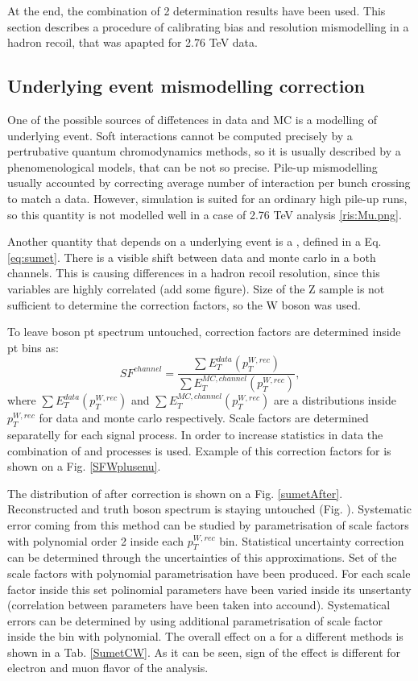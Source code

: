 At the end, the combination of 2 determination results have been used. This section describes a procedure of calibrating bias and resolution mismodelling in a hadron recoil, that was apapted for 2.76 TeV data. 

\subsection{Underlying event mismodelling correction}
One of the possible sources of diffetences in data and MC is a modelling of underlying event. Soft interactions cannot be computed precisely by a pertrubative quantum chromodynamics methods, so it is usually described by a phenomenological models, that can be not so precise.  
Pile-up mismodelling usually accounted by correcting average number of interaction per bunch crossing to match a data. However, \atlas simulation is suited for an ordinary high pile-up runs, so this quantity is not modelled well in a case of 2.76 TeV analysis \ref{ris:Mu.png}. 

Another quantity that depends on a underlying event is a \sumet, defined in a Eq. \ref{eq:sumet}.   There is a visible shift between data and monte carlo in a both channels. This is causing differences in a hadron recoil resolution, since this variables are highly correlated (add some figure).  Size of the Z sample is not sufficient to determine the correction factors, so the W boson was used. 

To leave boson pt spectrum untouched, correction factors are determined inside pt bins as:
\begin{equation}
SF^{channel}=\frac{\sum E_T^{data} (p_T^{W, rec})}{\sum E_T^{MC, channel} (p_T^{W, rec})},
\end{equation}
where $\sum E_T^{data} (p_T^{W, rec})$ and $\sum E_T^{MC, channel} (p_T^{W, rec})$  are a \sumet distributions inside $p_T^{W, rec}$ for data and monte carlo respectively. Scale factors are determined separatelly for each signal process.  In order to increase statistics in data the combination of \wenu and \wmunu processes is used. Example of this correction factors for \wplusenu is shown on a Fig. \ref{SFWplusenu}. 

The distribution of \sumet after correction is shown on a Fig. \ref{sumetAfter}. Reconstructed and truth boson spectrum is staying untouched (Fig. ).  Systematic error coming from this method can be studied by parametrisation  of scale factors with polynomial order 2 inside each $p_T^{W, rec}$ bin.  
Statistical uncertainty correction can be determined through the uncertainties of this approximations. Set of the scale factors with polynomial parametrisation have been produced. For each scale factor inside this set polinomial parameters have been varied inside its unsertanty (correlation between parameters have been taken into accound). 
Systematical errors can be determined by using additional parametrisation of scale factor inside the bin with polynomial. 
The overall effect on a \cw for a different methods is shown in a Tab. \ref{SumetCW}.  As it can be seen, sign of the effect is different for electron and muon flavor of the analysis. 
 


